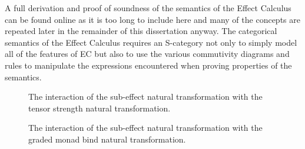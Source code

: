 \documentclass{Report}
\begin{document}

A full derivation and proof of soundness of the semantics of the Effect Calculus can be found online  as it is too long to include here and many of the concepts are repeated later in the remainder of this dissertation anyway. The categorical semantics of the Effect Calculus requires an S-category not only to simply model all of the features of EC but also to use the various commutivity diagrams and rules to manipulate the expressions encountered when proving properties of the semantics.



\begin{figure}
\centering
\begin{minipage}{0.45\textwidth}
    \qquad
    \caption{The interaction of the sub-effect natural transformation with the tensor strength natural transformation.}
    \label{SubeffectTensorStrength}
\end{minipage}  
\quad
\begin{minipage}{0.45\textwidth}
\caption{The interaction of the sub-effect natural transformation with the graded monad  bind natural transformation.}
\label{SubeffectBind}
\end{minipage}  
\end{figure}
\end{document}
